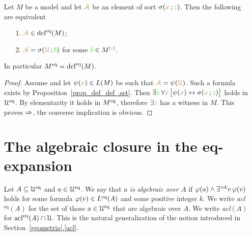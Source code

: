 \documentclass[creche.tex]{subfiles}
\begin{document}
\begin{proposition}\label{prop_standard_def_set}
Let $M$ be a model and let ${\color{brown}\EuScript A}$ be an element of sort $\sigma({\color{brown} x}\,;{\color{green} z})$. Then the following are equivalent
\begin{itemize}
\item[1.]  ${\color{brown}\EuScript A}\in\mathop{\rm dcl}^{{\rm eq}}(M)$; 
\item[2.]  ${\color{brown}\EuScript A}=\sigma({\color{brown}\EuScript U}\,;{\color{green} b})$ for some ${\color{green} b}\in M^{|{\color{green} z}|}$.
\end{itemize}
In particular $M^{{\rm eq}}=\mathop{\rm dcl}^{{\rm eq}}(M)$.
\end{proposition}

\begin{proof}
Assume  and let $\psi({\color{brown} x})\in L(M)$ be such that ${\color{brown}\EuScript A}=\psi({\color{brown}\EuScript U})$. Such a formula exists by Proposition~\ref{prop_def_def_set}. Then $\exists{\color{green}z}\,\forall{\color{brown}x}\,\big[\psi({\color{brown} x})\leftrightarrow\sigma({\color{brown} x}\,;{\color{green} z})\big]$ holds in $\EuScript U^{{\rm eq}}$. By elementarity it holds in $M^{{\rm eq}}$, therefore $\exists{\color{green}z}$ has a witness in $M$. This proves $\Rightarrow$, the converse implication is obvious.
\end{proof}

\section{The algebraic closure in the eq-expansion}

Let $A\subseteq\EuScript U^{{\rm eq}}$ and $a\in\EuScript U^{{\rm eq}}$. We say that \emph{$a$ is algebraic over $A$\/} if $\varphi(a)\wedge\exists^{=k}v\,\varphi(v)$ holds for some formula $\varphi(v)\in L^{{\rm eq}}(A)$ and some positive integer $k$. We write \emph{acl$^\textrm{eq}(A)$\/} for the set of those $a\in\EuScript U^{{\rm eq}}$ that are algebraic over $A$. We write \emph{acl$(A)$\/} for $\mathop{\rm acl}^{{\rm eq}}(A)\cap\EuScript U$. This is the natural generalization of the notion introduced in Section~\hyperref[acl]{\ref*{geometria}.\ref*{acl}}.

\end{document}
